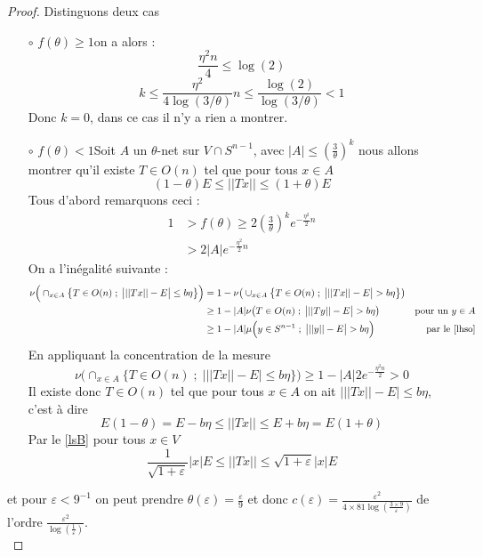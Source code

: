 \documentclass[12pt]{article}
\theoremstyle{definition}
\begin{document}
\begin{proof}
	Distinguons deux cas 
	\begin{enumerate}[leftmargin=\labelsep]
		\item[$\circ$] {$f(\theta)\geq1$}\newline on a alors :
		\begin{equation*}
		\frac{\eta^2n}{4}\leq \log(2)
		\end{equation*}
		\begin{equation*}
		k\leq \frac{\eta^2}{4\log(3/\theta)}n\leq \frac{\log(2)}{\log(3/\theta)}<1
		\end{equation*}
		Donc $k=0$, dans ce cas il n'y a rien a montrer.
		\item[$\circ$] $f(\theta)<1$\newline Soit $A$ un $\theta$-net sur $V\cap S^{n-1}$, avec $|A|\leq(\frac{3}{\theta})^k$ nous allons montrer qu'il existe $T\in O(n)$ tel que pour tous $x\in A$ 
		\begin{equation*}
		(1-\theta) E \leq ||Tx|| \leq (1+ \theta)E
		\end{equation*}
		Tous d'abord remarquons ceci :
		\begin{align*}
		1&>f(\theta)\geq 2(\frac{3}{\theta})^ke^{-\frac{\eta^2}{2}n} \\
		&> 2|A|e^{-\frac{\eta^2}{2}n}
		\end{align*}
		On a l'inégalité suivante : 
		\begin{align*}
		\nu\Big(\cap_{x\in A}\big\{T\in O(n)\; ; \;  \big| ||Tx||-E \big|\leq b\eta\big\}\Big)& = 1-\nu\big(\cup_{x\in A}\big\{T\in O(n)\; ; \; \big| ||Tx||-E \big|>b\eta\big\}\big)& \\
		& \geq 1-|A|\nu\big(T\in O(n)\; ; \; \big| ||Ty||-E \big|>b\eta\big)& \text{pour un $y\in A$}\\
		& \geq 1 - |A|\mu\Big(y\in S^{n-1}\; ;\; \big| ||y||-E \big|>b\eta\Big) & \text{par le \cref{lhso}}
		\end{align*} 
		En appliquant la concentration de la mesure
		\begin{equation*}
		\nu\Big(\cap_{x\in A}\big\{T\in O(n)\; ; \;  \big| ||Tx||-E \big|\leq b\eta\big\}\Big)\geq 1 - |A|2e^{-\frac{\eta^2n}{2}} >0
		\end{equation*}	
		Il existe donc $T\in O(n)$ tel que pour tous $x\in A$ on ait $\big|||Tx||-E \big|\leq b \eta$, c'est à dire 
		\begin{equation*}
		E(1-\theta)=E-b\eta\leq ||Tx||\leq E+b\eta=E(1+\theta)
		\end{equation*}
		Par le \cref{lsB} pour tous $x\in V$
		\begin{equation*}
		\frac{1}{\sqrt{1+\varepsilon}}|x| E\leq ||Tx||\leq \sqrt{1+\varepsilon}|x| E
		\end{equation*}
	\end{enumerate}
	et pour $\varepsilon<9^{-1}$ on peut prendre $\theta(\varepsilon)=\frac{\varepsilon}{9}$ et donc $c(\varepsilon)=\frac{\varepsilon^2}{4\times 81\log(\frac{3\times9}{\varepsilon})} $ de l'ordre $\frac{\varepsilon^2}{\log(\frac{1}{\varepsilon})}$.\\ 
\end{proof}
\end{document}
